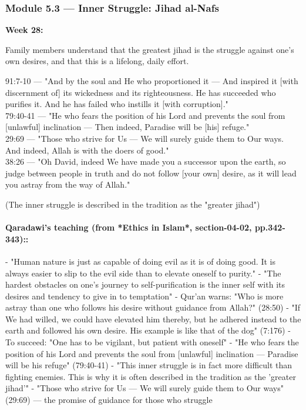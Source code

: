 \documentclass[11pt,a4paper]{article}
\begin{document}
\subsubsection*{Module 5.3 --- Inner Struggle: Jihad al-Nafs}
\textbf{Week 28:} 

\begin{outcomebox} Family members understand that the greatest jihad is the struggle against one's own desires, and that this is a lifelong, daily effort. \end{outcomebox}

\begin{quranbox} 91:7-10 --- "And by the soul and He who proportioned it --- And inspired it [with discernment of] its wickedness and its righteousness. He has succeeded who purifies it. And he has failed who instills it [with corruption]." \\ 79:40-41 --- "He who fears the position of his Lord and prevents the soul from [unlawful] inclination --- Then indeed, Paradise will be [his] refuge." \\ 29:69 --- "Those who strive for Us --- We will surely guide them to Our ways. And indeed, Allah is with the doers of good." \\ 38:26 --- "Oh David, indeed We have made you a successor upon the earth, so judge between people in truth and do not follow [your own] desire, as it will lead you astray from the way of Allah." \end{quranbox}

\begin{hadithbox} (The inner struggle is described in the tradition as the "greater jihad") \end{hadithbox}

\paragraph*{Qaradawi's teaching (from *Ethics in Islam*, section-04-02, pp.342-343)::}  - "Human nature is just as capable of doing evil as it is of doing good. It is always easier to slip to the evil side than to elevate oneself to purity." - "The hardest obstacles on one's journey to self-purification is the inner self with its desires and tendency to give in to temptation" - Qur'an warns: "Who is more astray than one who follows his desire without guidance from Allah?" (28:50) - "If We had willed, we could have elevated him thereby, but he adhered instead to the earth and followed his own desire. His example is like that of the dog" (7:176) - To succeed: "One has to be vigilant, but patient with oneself" - "He who fears the position of his Lord and prevents the soul from [unlawful] inclination --- Paradise will be his refuge" (79:40-41) - "This inner struggle is in fact more difficult than fighting enemies. This is why it is often described in the tradition as the 'greater jihad'" - "Those who strive for Us --- We will surely guide them to Our ways" (29:69) --- the promise of guidance for those who struggle
\end{document}
